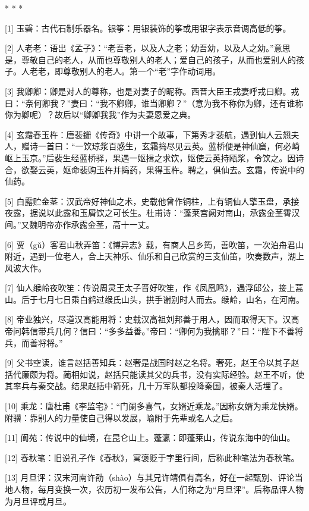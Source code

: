 \documentclass[12pt,UTF8]{ctexbook}
\begin{document}
* * *



[1] 玉磬：古代石制乐器名。银筝：用银装饰的筝或用银字表示音调高低的筝。

[2] 人老老：语出《孟子》：“老吾老，以及人之老；幼吾幼，以及人之幼。”意思是，尊敬自己的老人，从而也尊敬别人的老人；爱自己的孩子，从而也爱别人的孩子。人老老，即尊敬别人的老人。第一个“老”字作动词用。

[3] 我卿卿：卿是对人的尊称，也是对妻子的昵称。西晋大臣王戎妻呼戎曰卿。戎曰：“奈何卿我？”妻曰：“我不卿卿，谁当卿卿？”（意为我不称你为卿，还有谁称你为卿呢）？故后以“卿卿我我”作为夫妻恩爱之典。

[4] 玄霜舂玉杵：唐裴銏《传奇》中讲一个故事，下第秀才裴航，遇到仙人云翘夫人，赠诗一首曰：“一饮琼浆百感生，玄霜捣尽见云英。蓝桥便是神仙窟，何必崎岖上玉京。”后裴生经蓝桥驿，果遇一妪揖之求饮，妪使云英持瓯浆，令饮之。因诗合，欲娶云英，妪命裴购玉杵并捣药，果得玉杵。聘之，俱仙去。玄霜，传说中的仙药。

[5] 白露贮金茎：汉武帝好神仙之术，史载他曾作铜柱，上有铜仙人擎玉盘，承接夜露，据说以此露和玉屑饮之可长生。杜甫诗：“蓬莱宫阙对南山，承露金茎霄汉间。”又魏明帝亦作承露金茎，高十一丈。

[6] 贾（gǔ）客君山秋弄笛：《博异志》载，有商人吕乡筠，善吹笛，一次泊舟君山附近，遇到一位老人，合上天神乐、仙乐和自己欣赏的三支仙笛，吹奏数声，湖上风波大作。

[7] 仙人缑岭夜吹笙：传说周灵王太子晋好吹笙，作《凤凰鸣》，遇浮邱公，接上蒿山。后于七月七日乘白鹤过缑氏山头，拱手谢别时人而去。缑岭，山名，在河南。

[8] 帝业独兴，尽道汉高能用将：史载汉高祖刘邦善于用人，因而取得天下。汉高帝问韩信带兵几何？信曰：“多多益善。”帝曰：“卿何为我擒耶？”曰：“陛下不善将兵，而善将将。”

[9] 父书空读，谁言赵括善知兵：赵奢是战国时赵之名将。奢死，赵王令以其子赵括代廉颇为将。蔺相如说，赵括只能读其父的兵书，没有实际经验。赵王不听，使其率兵与秦交战。结果赵括中箭死，几十万军队都投降秦国，被秦人活埋了。

[10] 乘龙：唐杜甫《李监宅》：“门阑多喜气，女婿近乘龙。”因称女婿为乘龙快婿。附骥：靠别人的力量使自己得以发展，喻附于先辈或名人之后。

[11] 阆苑：传说中的仙境，在昆仑山上。蓬瀛：即蓬莱山，传说东海中的仙山。

[12] 春秋笔：旧说孔子作《春秋》，寓褒贬于字里行间，后称此种笔法为春秋笔。

[13] 月旦评：汉末河南许劭（shào）与其兄许靖俱有高名，好在一起甄别、评论当地人物，每月变换一次，农历初一发布公告，人们称之为“月旦评”。后称品评人物为月旦评或月旦。
\end{document}
